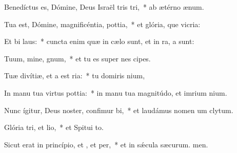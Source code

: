 \item Benedíctus es, Dómine, Deus Israël tris tri,~* ab ætérno  ænum.
\item Tua est, Dómine, magnificéntia,  pottia,~* et glória, que vicria:
\item Et bi laus:~* cuncta enim quæ in cælo sunt, et in ra, a sunt:
\item Tuum, mine, gnum,~* et tu es super nes cipes.
\item Tuæ divítiæ, et a est ria:~* tu domiris nium,
\item In manu tua virtus  pottia:~* in manu tua magnitúdo, et imrium nium.
\item Nunc ígitur, Deus noster, confimur bi,~* et laudámus nomen um clytum.
\item Glória tri, et lio,~* et Spitui to.
\item Sicut erat in princípio, et , et per,~* et in sǽcula sæcurum. men.
